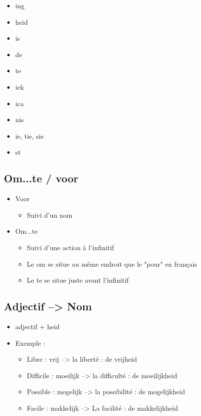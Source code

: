 \documentclass[a4paper]{article}
\begin{document}
\begin{itemize}[label=\textbullet, font=\Large]
\begin{itemize}[label=, font=\scriptsize]
    \begin{itemize}
      \item ing
      \item heid
      \item is
      \item de
      \item te
      \item iek
      \item ica
      \item nis
      \item ie, tie, sie
      \item st
    \end{itemize}
  \end{itemize}
\end{itemize}

\subsection{Om...te / voor}
\begin{itemize}[label=\textbullet, font=\Large]
  \item Voor
  \begin{itemize}[label=, font=\scriptsize]
    \item Suivi d'un nom
  \end{itemize}
  \item Om...te
  \begin{itemize}[label=, font=\scriptsize]
    \item Suivi d'une action à l'infinitif
    \item Le om se situe au même endroit que le "pour" en français
    \item Le te se situe juste avant l'infinitif
  \end{itemize}
\end{itemize}

\subsection{Adjectif --> Nom}
\begin{itemize}[label=\textbullet, font=\Large]
  \item adjectif + heid
  \item Exemple :
  \begin{itemize}[label=, font=\scriptsize]
    \item Libre : vrij --> la liberté : de vrijheid
    \item Difficile : moeilijk --> la difficulté : de moeilijkheid
    \item Possible : mogelijk --> la possibilité : de mogelijkheid
    \item Facile : makkelijk --> La facilité : de makkelijkheid
  \end{itemize}
\end{itemize}
\end{document}
